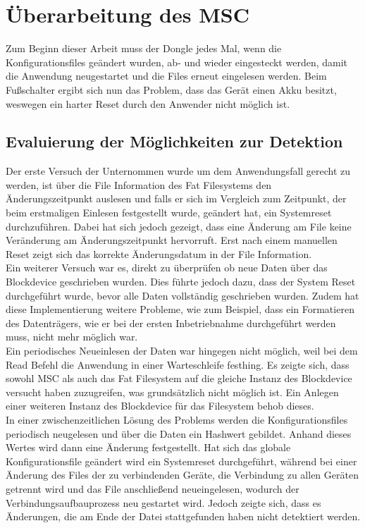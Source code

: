 \section{Überarbeitung des MSC}
Zum Beginn dieser Arbeit muss der Dongle jedes Mal, wenn die Konfigurationsfiles geändert wurden, ab- und wieder eingesteckt werden, damit die Anwendung neugestartet und die Files erneut eingelesen werden. Beim Fußschalter ergibt sich nun das Problem, dass das Gerät einen Akku besitzt, weswegen ein harter Reset durch den Anwender nicht möglich ist.

\subsection{Evaluierung der Möglichkeiten zur Detektion}
Der erste Versuch der Unternommen wurde um dem Anwendungsfall gerecht zu werden, ist über die File Information des Fat Filesystems den Änderungszeitpunkt auslesen und falls er sich im Vergleich zum Zeitpunkt, der beim erstmaligen Einlesen festgestellt wurde, geändert hat, ein Systemreset durchzuführen. Dabei hat sich jedoch gezeigt, dass eine Änderung am File keine Veränderung am Änderungszeitpunkt hervorruft. Erst nach einem manuellen Reset zeigt sich das korrekte Änderungsdatum in der File Information. \\
Ein weiterer Versuch war es, direkt zu überprüfen ob neue Daten über das Blockdevice geschrieben wurden. Dies führte jedoch dazu, dass der System Reset durchgeführt wurde, bevor alle Daten vollständig geschrieben wurden. Zudem hat diese Implementierung weitere Probleme, wie zum Beispiel, dass ein Formatieren des Datenträgers, wie er bei der ersten Inbetriebnahme durchgeführt werden muss, nicht mehr möglich war. \\
Ein periodisches Neueinlesen der Daten war hingegen nicht möglich, weil bei dem Read Befehl die Anwendung in einer Warteschleife festhing. Es zeigte sich, dass sowohl MSC als auch das Fat Filesystem auf die gleiche Instanz des Blockdevice versucht haben zuzugreifen, was grundsätzlich nicht möglich ist. Ein Anlegen einer weiteren Instanz des Blockdevice für das Filesystem behob dieses. \\
In einer zwischenzeitlichen Lösung des Problems werden die Konfigurationsfiles periodisch neugelesen und über die Daten ein Hashwert gebildet. Anhand dieses Wertes wird dann eine Änderung festgestellt. Hat sich das globale Konfigurationsfile geändert wird ein Systemreset durchgeführt, während bei einer Änderung des Files der zu verbindenden Geräte, die Verbindung zu allen Geräten getrennt wird und das File anschließend neueingelesen, wodurch der Verbindungsaufbauprozess neu gestartet wird. Jedoch zeigte sich, dass es Änderungen, die am Ende der Datei stattgefunden haben nicht detektiert werden.

